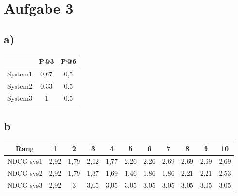 \section*{Aufgabe 3}

\subsection*{a)}
\begin{center}
\begin{tabular}{|c|c|c|}
\hline & P@3 & P@6\\
\hline System1 & 0,67 & 0,5 \\
\hline System2 & 0.33 & 0.5 \\
\hline System3 & 1 & 0.5 \\
\hline
\end{tabular}
\end{center}

\subsection*{b}
\begin{tabular}{|c|c|c|c|c|c|c|c|c|c|c|}
\hline Rang 	& 1 & 2 	& 3 & 4 & 5 & 6 & 7 & 8 & 9 & 10\\

\hline NDCG sys1& 2,92 & 1,79 & 2,12 & 1,77 & 2,26 & 2,26 & 2,69 & 2,69 & 2,69 & 2,69\\
\hline NDCG sys2& 2,92 & 1,79 & 1,37 & 1,69 & 1,46 & 1,86 & 1,86 & 2,21 & 2,21 & 2,53\\
\hline NDCG sys3& 2,92 & 3 & 3,05 & 3,05 & 3,05 & 3,05 & 3,05 & 3,05 & 3,05 & 3,05\\
\hline
\end{tabular}
